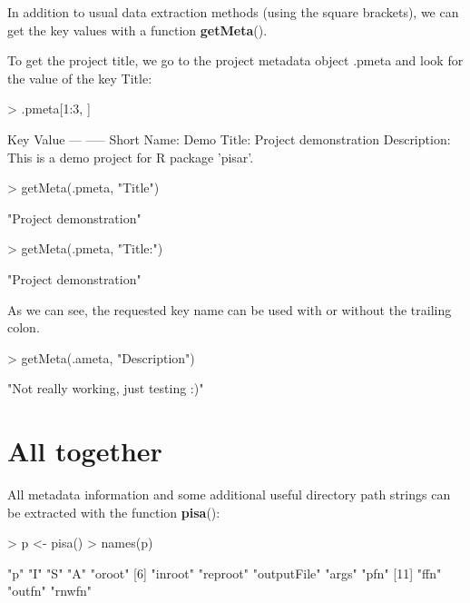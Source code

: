 \documentclass[a4paper,12pt]{article}\usepackage[]{graphicx}\usepackage[]{color}
\makeatletter
\providecommand\code{\bgroup\@codex}
\def\@codex#1{{\normalfont\ttfamily\hyphenchar\font=-1  #1}\egroup}
\providecommand{\fct}[1]{{\ttfamily\textbf{#1}()}}
\makeatother
\begin{document}
In addition to usual data extraction methods (using the square brackets), we can get the key values with a function \fct{getMeta}.

To get the project title, we go to the project metadata object \code{.pmeta} and look for the value of the key \code{Title:}

\begin{Schunk}
\begin{Sinput}
> .pmeta[1:3, ]
\end{Sinput}
\begin{Soutput}
 Key          Value
 ---          -----
 Short Name:  Demo
 Title:       Project demonstration
 Description: This is a demo project for R package 'pisar'.
\end{Soutput}
\end{Schunk}



\begin{Schunk}
\begin{Sinput}
> getMeta(.pmeta, "Title")
\end{Sinput}
\begin{Soutput}
[1] "Project demonstration"
\end{Soutput}
\begin{Sinput}
> getMeta(.pmeta, "Title:")
\end{Sinput}
\begin{Soutput}
[1] "Project demonstration"
\end{Soutput}
\end{Schunk}

As we can see, the requested key name can be used with or without the trailing colon.

\begin{Schunk}
\begin{Sinput}
> getMeta(.ameta, "Description")
\end{Sinput}
\begin{Soutput}
[1] "Not really working, just testing :)"
\end{Soutput}
\end{Schunk}

\section{All together}

All metadata information and some additional useful directory path strings can be extracted with the function \fct{pisa}:

\begin{Schunk}
\begin{Sinput}
> p <- pisa()
> names(p)
\end{Sinput}
\begin{Soutput}
 [1] "p"          "I"          "S"          "A"          "oroot"     
 [6] "inroot"     "reproot"    "outputFile" "args"       "pfn"       
[11] "ffn"        "outfn"      "rnwfn"     
\end{Soutput}
\end{Schunk}
\end{document}
